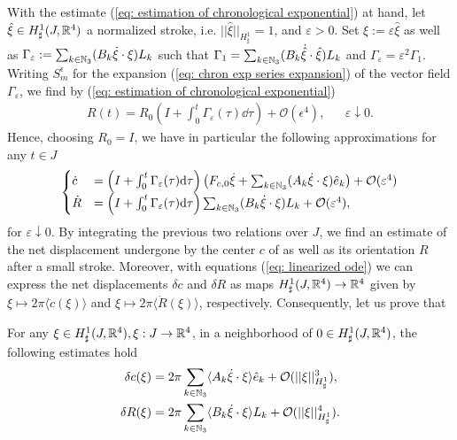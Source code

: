 With the estimate (\ref{eq: estimation of chronological exponential}) at hand, let $\hat{\xi} \in H^1_{\sharp}(J, \mathbb{R}^4)$ a normalized stroke, i.e. $||\hat{\xi}||_{H_{\sharp}^1} = 1$, and $\varepsilon > 0$. Set $\xi := \varepsilon \hat{\xi}$ as well as $\Gamma_\varepsilon := \sum_{k \in \mathbb{N}_3}(B_k \dot{\xi} \cdot \xi) L_k$ such that $\Gamma_1 = \sum_{k \in \mathbb{N}_3}(B_k \dot{\hat{\xi}} \cdot \hat{\xi}) L_k$ and  $\Gamma_\varepsilon = \varepsilon^2 \Gamma_1$. Writing $S_{m}^{\epsilon}$ for the expansion (\ref{eq: chron exp series expansion}) of the vector field $\Gamma_\varepsilon$, we find by (\ref{eq: estimation of chronological exponential})
\begin{align}
	R(t) = R_0 \left ( I + \int_{0}^{t} \Gamma_\varepsilon(\tau) \dd\tau \right ) + \mathcal{O}(\epsilon^4), & & \varepsilon \downarrow 0.
\end{align}
Hence, choosing $R_0 = I$, we have in particular the following approximations for any $t \in J $
\begin{align}
\label{eq: linearized ode}
\begin{cases}
\dot{c} &= \left ( I + \int_{0}^{t} \Gamma_\varepsilon(\tau) \mathrm{d}\tau \right ) \left ( F_{c,0} \dot{\xi} + \sum_{k \in \mathbb{N}_3} (A_k \dot{\xi} \cdot \xi) \hat{e}_k \right )  + \mathcal{O}(\varepsilon^4)\\
\dot{R} &= \left ( I + \int_{0}^{t} \Gamma_\varepsilon(\tau) \mathrm{d}\tau \right ) \sum_{k \in \mathbb{N}_3}(B_k \dot{\xi} \cdot \xi) L_k + \mathcal{O}(\varepsilon^4),
\end{cases}
\end{align}
for $\varepsilon\downarrow 0$. By integrating the previous two relations over $J$, we find an estimate of the net displacement undergone by the center $c$ of \spr as well as its orientation $R$ after a small stroke. Moreover, with equations (\ref{eq: linearized ode}) we can express the net displacements $\delta c$ and $\delta R$ as maps $H_{\sharp}^1(J,\mathbb{R}^4) \to \mathbb{R}^4$ given by $\xi \mapsto 2 \pi \langle \dot{c}(\xi) \rangle $ and $\xi \mapsto 2 \pi \langle \dot{R}(\xi) \rangle$, respectively. Consequently, let us prove that

\begin{proposition}
For any $\xi \in H_\sharp^1(J, \mathbb{R}^4), \xi: J \to \mathbb{R}^4$, in a neighborhood of $0 \in H_{\sharp}^{1}(J, \mathbb{R}^4)$, the following estimates hold
\begin{equation}
\begin{aligned}
\delta c(\xi) &= 2 \pi \sum_{k \in \mathbb{N}_3} \langle A_k \dot{\xi} \cdot \xi \rangle \hat{e}_k + \mathcal{O}(||\xi||_{H^1_{\sharp}}^3),\\
\delta R(\xi) &= 2 \pi \sum_{k \in \mathbb{N}_3} \langle B_k \dot{\xi} \cdot \xi \rangle L_k + \mathcal{O}(||\xi||^4_{H_\sharp^1}).
\end{aligned}
\end{equation}
\end{proposition}

